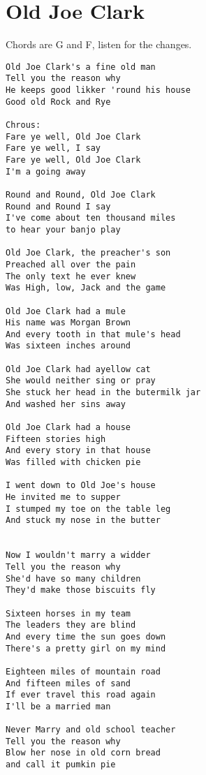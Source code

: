 \documentclass[leqno]{memoir}
\begin{document}
\chapter{Old Joe Clark}
Chords are G and F, listen for the changes.
\begin{verbatim}
Old Joe Clark's a fine old man
Tell you the reason why
He keeps good likker 'round his house
Good old Rock and Rye

Chrous:
Fare ye well, Old Joe Clark
Fare ye well, I say
Fare ye well, Old Joe Clark
I'm a going away

Round and Round, Old Joe Clark
Round and Round I say
I've come about ten thousand miles
to hear your banjo play

Old Joe Clark, the preacher's son
Preached all over the pain
The only text he ever knew
Was High, low, Jack and the game

Old Joe Clark had a mule
His name was Morgan Brown
And every tooth in that mule's head
Was sixteen inches around

Old Joe Clark had ayellow cat
She would neither sing or pray
She stuck her head in the butermilk jar
And washed her sins away

Old Joe Clark had a house
Fifteen stories high
And every story in that house
Was filled with chicken pie

I went down to Old Joe's house
He invited me to supper
I stumped my toe on the table leg
And stuck my nose in the butter


Now I wouldn't marry a widder
Tell you the reason why
She'd have so many children
They'd make those biscuits fly

Sixteen horses in my team
The leaders they are blind
And every time the sun goes down
There's a pretty girl on my mind

Eighteen miles of mountain road
And fifteen miles of sand
If ever travel this road again
I'll be a married man

Never Marry and old school teacher
Tell you the reason why
Blow her nose in old corn bread
and call it pumkin pie



\end{verbatim}
\newpage
\end{document}
